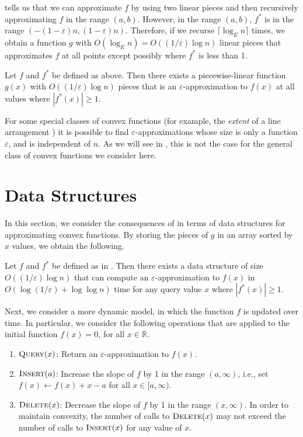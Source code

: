 \documentclass[charterfonts,lotsofwhite]{patmorin}
\newcommand{\eps}{\varepsilon}
\newcommand{\Real}{\mathbb{R}}
\begin{document}
 tells us that we can approximate $f$ by using two
linear pieces and then recursively approximating $f$ in the range
$(a,b)$.  However, in the range $(a,b)$, $f^*$ is in the range
$(-(1-\eps)n, (1-\eps)n)$.  Therefore, if we recurse $\lceil \log_E
n\rceil$ times, we obtain a function $g$ with $O(\log_E n) =
O((1/\eps) \log n)$ linear pieces that approximates $f$ at all points
except possibly where $f^*$ is less than 1.

\begin{thm}
Let $f$ and $f^*$ be defined as above.  Then there exists a piecewise-linear
function $g(x)$ with $O((1/\eps)\log n)$ pieces that is an
$\eps$-approximation to $f(x)$ at all values where $|f^*(x)|\ge 1$.
\end{thm}

For some special classes of convex functions (for example, the
\emph{extent} of a line arrangement \cite{ah01}) it is possible to
find $\eps$-approximations whose size is only a function $\eps$, and
is independent of $n$.  As we will see in , this is
not the case for the general class of convex functions we consider here.

\section{Data Structures}

In this section, we consider the consequences of  in
terms of data structures for approximating convex functions.  By
storing the pieces of $g$ in an array sorted by $x$ values, we obtain
the following.

\begin{thm}
Let $f$ and $f^*$ be defined as in .  Then there exists
a data structure of size $O((1/\eps) \log n)$ that can compute an
$\eps$-approximation to $f(x)$ in $O(\log (1/\eps) + \log \log n)$
time for any query value $x$ where $|f^*(x)|\ge 1$.
\end{thm}

Next, we consider a more dynamic model, in which the function $f$ is
updated over time.  In particular, we consider the following
operations that are applied to the initial function $f(x)=0$, for all
$x\in\Real$.

\begin{enumerate}
\item $\textsc{Query}(x)$: Return an $\eps$-approximation to
  $f(x)$.

\item $\textsc{Insert}(a)$: Increase the slope of $f$ by 1 in the
  range $(a,\infty)$, i.e., set $f(x)\gets f(x)+x-a$ for all $x\in
  [a,\infty)$.

\item $\textsc{Delete}(x)$: Decrease the slope of $f$ by 1 in the
  range $(x,\infty)$.  In order to maintain convexity, the number of
  calls to $\textsc{Delete}(x)$ may not exceed the number of calls to
  $\textsc{Insert}(x)$ for any value of $x$.
\end{enumerate}
\end{document}
